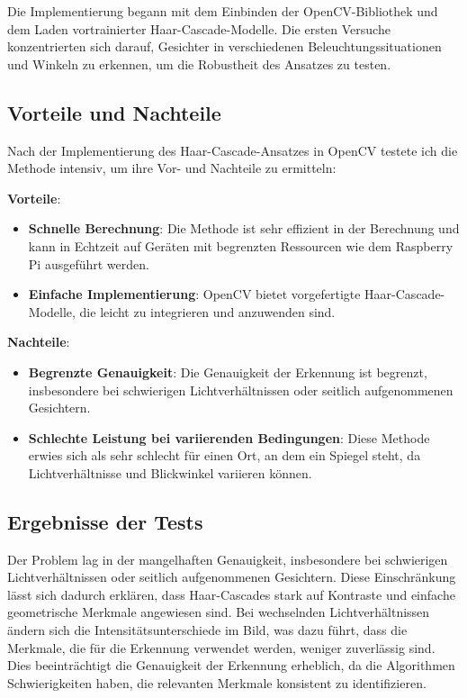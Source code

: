 Die Implementierung begann mit dem Einbinden der OpenCV-Bibliothek und dem Laden vortrainierter Haar-Cascade-Modelle. Die ersten Versuche konzentrierten sich darauf, Gesichter in verschiedenen Beleuchtungssituationen und Winkeln zu erkennen, um die Robustheit des Ansatzes zu testen.


\subsection{Vorteile und Nachteile}
Nach der Implementierung des Haar-Cascade-Ansatzes in OpenCV testete ich die Methode intensiv, um ihre Vor- und Nachteile zu ermitteln:

\textbf{Vorteile}:
\begin{itemize}
    \item \textbf{Schnelle Berechnung}: Die Methode ist sehr effizient in der Berechnung und kann in Echtzeit auf Geräten mit begrenzten Ressourcen wie dem Raspberry Pi ausgeführt werden.
    \item \textbf{Einfache Implementierung}: OpenCV bietet vorgefertigte Haar-Cascade-Modelle, die leicht zu integrieren und anzuwenden sind.
\end{itemize}

\textbf{Nachteile}:
\begin{itemize}
    \item \textbf{Begrenzte Genauigkeit}: Die Genauigkeit der Erkennung ist begrenzt, insbesondere bei schwierigen Lichtverhältnissen oder seitlich aufgenommenen Gesichtern.
    \item \textbf{Schlechte Leistung bei variierenden Bedingungen}: Diese Methode erwies sich als sehr schlecht für einen Ort, an dem ein Spiegel steht, da Lichtverhältnisse und Blickwinkel variieren können.
\end{itemize}

\subsection{Ergebnisse der Tests}

 Der Problem lag in der mangelhaften Genauigkeit, insbesondere bei schwierigen Lichtverhältnissen oder seitlich aufgenommenen Gesichtern. Diese Einschränkung lässt sich dadurch erklären, dass Haar-Cascades stark auf Kontraste und einfache geometrische Merkmale angewiesen sind. Bei wechselnden Lichtverhältnissen ändern sich die Intensitätsunterschiede im Bild, was dazu führt, dass die Merkmale, die für die Erkennung verwendet werden, weniger zuverlässig sind. Dies beeinträchtigt die Genauigkeit der Erkennung erheblich, da die Algorithmen Schwierigkeiten haben, die relevanten Merkmale konsistent zu identifizieren.

